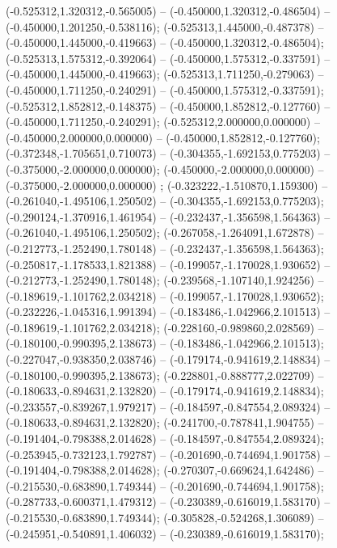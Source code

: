  (-0.525312,1.320312,-0.565005) -- (-0.450000,1.320312,-0.486504) -- (-0.450000,1.201250,-0.538116);
 (-0.525313,1.445000,-0.487378) -- (-0.450000,1.445000,-0.419663) -- (-0.450000,1.320312,-0.486504);
 (-0.525313,1.575312,-0.392064) -- (-0.450000,1.575312,-0.337591) -- (-0.450000,1.445000,-0.419663);
 (-0.525313,1.711250,-0.279063) -- (-0.450000,1.711250,-0.240291) -- (-0.450000,1.575312,-0.337591);
 (-0.525312,1.852812,-0.148375) -- (-0.450000,1.852812,-0.127760) -- (-0.450000,1.711250,-0.240291);
 (-0.525312,2.000000,0.000000) -- (-0.450000,2.000000,0.000000) -- (-0.450000,1.852812,-0.127760);
 (-0.372348,-1.705651,0.710073) -- (-0.304355,-1.692153,0.775203) -- (-0.375000,-2.000000,0.000000);
 (-0.450000,-2.000000,0.000000) -- (-0.375000,-2.000000,0.000000) ;
 (-0.323222,-1.510870,1.159300) -- (-0.261040,-1.495106,1.250502) -- (-0.304355,-1.692153,0.775203);
 (-0.290124,-1.370916,1.461954) -- (-0.232437,-1.356598,1.564363) -- (-0.261040,-1.495106,1.250502);
 (-0.267058,-1.264091,1.672878) -- (-0.212773,-1.252490,1.780148) -- (-0.232437,-1.356598,1.564363);
 (-0.250817,-1.178533,1.821388) -- (-0.199057,-1.170028,1.930652) -- (-0.212773,-1.252490,1.780148);
 (-0.239568,-1.107140,1.924256) -- (-0.189619,-1.101762,2.034218) -- (-0.199057,-1.170028,1.930652);
 (-0.232226,-1.045316,1.991394) -- (-0.183486,-1.042966,2.101513) -- (-0.189619,-1.101762,2.034218);
 (-0.228160,-0.989860,2.028569) -- (-0.180100,-0.990395,2.138673) -- (-0.183486,-1.042966,2.101513);
 (-0.227047,-0.938350,2.038746) -- (-0.179174,-0.941619,2.148834) -- (-0.180100,-0.990395,2.138673);
 (-0.228801,-0.888777,2.022709) -- (-0.180633,-0.894631,2.132820) -- (-0.179174,-0.941619,2.148834);
 (-0.233557,-0.839267,1.979217) -- (-0.184597,-0.847554,2.089324) -- (-0.180633,-0.894631,2.132820);
 (-0.241700,-0.787841,1.904755) -- (-0.191404,-0.798388,2.014628) -- (-0.184597,-0.847554,2.089324);
 (-0.253945,-0.732123,1.792787) -- (-0.201690,-0.744694,1.901758) -- (-0.191404,-0.798388,2.014628);
 (-0.270307,-0.669624,1.642486) -- (-0.215530,-0.683890,1.749344) -- (-0.201690,-0.744694,1.901758);
 (-0.287733,-0.600371,1.479312) -- (-0.230389,-0.616019,1.583170) -- (-0.215530,-0.683890,1.749344);
 (-0.305828,-0.524268,1.306089) -- (-0.245951,-0.540891,1.406032) -- (-0.230389,-0.616019,1.583170);

